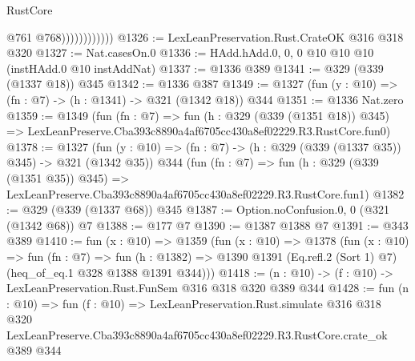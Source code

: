 \begin{lexlean}{RustCore}
\begin{coremodule}
                            @761
                            @768))))))))))))
@1326 := LexLeanPreservation.Rust.CrateOK @316 @318 @320
@1327 := Nat.casesOn.{0}
@1336 := HAdd.hAdd.{0, 0, 0} @10 @10 @10 (instHAdd.{0} @10 instAddNat)
@1337 := @1336 @389
@1341 := @329 (@339 (@1337 @18)) @345
@1342 := @1336 @387
@1349 := @1327 (fun (y : @10) => (fn : @7) -> (h : @1341) -> @321 (@1342 @18)) @344
@1351 := @1336 Nat.zero
@1359 := @1349
    (fun (fn : @7) =>
    fun (h : @329 (@339 (@1351 @18)) @345) =>
    LexLeanPreserve.Cba393c8890a4af6705cc430a8ef02229.R3.RustCore.fun0)
@1378 := @1327
    (fun (y : @10) => (fn : @7) -> (h : @329 (@339 (@1337 @35)) @345) -> @321 (@1342 @35))
    @344
    (fun (fn : @7) =>
    fun (h : @329 (@339 (@1351 @35)) @345) =>
    LexLeanPreserve.Cba393c8890a4af6705cc430a8ef02229.R3.RustCore.fun1)
@1382 := @329 (@339 (@1337 @68)) @345
@1387 := Option.noConfusion.{0, 0} (@321 (@1342 @68)) @7
@1388 := @177 @7
@1390 := @1387 @1388 @7
@1391 := @343 @389
@1410 := fun (x : @10) =>
  @1359
    (fun (x : @10) =>
    @1378
      (fun (x : @10) =>
      fun (fn : @7) =>
      fun (h : @1382) =>
      @1390 @1391 (Eq.refl.{2} (Sort 1) @7) (heq_of_eq.{1} @328 @1388 @1391 @344)))
@1418 := (n : @10) -> (f : @10) -> LexLeanPreservation.Rust.FunSem @316 @318 @320 @389 @344
@1428 := fun (n : @10) =>
  fun (f : @10) =>
  LexLeanPreservation.Rust.simulate
    @316
    @318
    @320
    LexLeanPreserve.Cba393c8890a4af6705cc430a8ef02229.R3.RustCore.crate_ok
    @389
    @344
\end{coremodule}
\end{lexlean}
